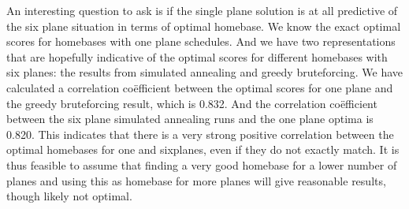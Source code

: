 \documentclass[journal]{IEEEtran}
\begin{document}
An interesting question to ask is if the single plane solution is at all predictive of the six plane situation in terms of optimal homebase. We know the exact optimal scores for homebases with one plane schedules. And we have two representations that are hopefully indicative of the optimal scores for different homebases with six planes: the results from simulated annealing and greedy bruteforcing. We have calculated a correlation co\"efficient between the optimal scores for one plane and the greedy bruteforcing result, which is 0.832. And the correlation co\"efficient between the six plane simulated annealing runs and the one plane optima is 0.820. This indicates that there is a very strong positive correlation between the optimal homebases for one and sixplanes, even if they do not exactly match. It is thus feasible to assume that finding a very good homebase for a lower number of planes and using this as homebase for more planes will give reasonable results, though likely not optimal.
\end{document}

